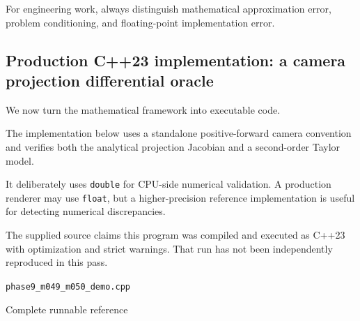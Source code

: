 For engineering work, always distinguish mathematical approximation error, problem conditioning, and floating-point implementation error.

\subsection{Production C++23 implementation: a camera projection differential oracle}\label{02-foundations-ii-ch021-production-c23-implementation-a-camera-projection-differential-oracle}

We now turn the mathematical framework into executable code.

The implementation below uses a standalone positive-forward camera convention and verifies both the analytical projection Jacobian and a second-order Taylor model.

It deliberately uses \texttt{double} for CPU-side numerical validation. A production renderer may use \texttt{float}, but a higher-precision reference implementation is useful for detecting numerical discrepancies.

The supplied source claims this program was compiled and executed as C++23 with optimization and strict warnings. That run has not been independently reproduced in this pass.

\texttt{phase9\_m049\_m050\_demo.cpp}

Complete runnable reference

